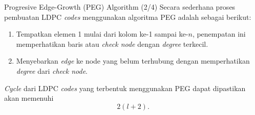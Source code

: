 \documentclass[11pt, aspectratio=169]{beamer}
\newcommand\blfootnote[1]{%
  \begingroup
  \renewcommand\thefootnote{}\footnote{#1}%
  \addtocounter{footnote}{-1}%
  \endgroup
}
\begin{document}
\begin{frame}{Progresive Edge-Growth (PEG) Algorithm (2/4)}
	Secara sederhana proses pembuatan LDPC \textit{codes} menggunakan algoritma PEG adalah sebagai  berikut:
	\begin{enumerate}
		\item Tempatkan elemen 1 mulai dari kolom ke-1 sampai ke-$n$, penempatan ini memperhatikan baris atau \textit{check node} dengan \textit{degree} terkecil.
		\item Menyebarkan \textit{edge} ke node yang belum terhubung dengan memperhatikan \textit{degree} dari \textit{check node}.
	\end{enumerate}
	\textit{Cycle} dari LDPC \textit{codes} yang terbentuk menggunakan PEG dapat dipastikan akan memenuhi 
	\begin{equation}
		2(l+2).
	\end{equation}


	
	
\end{frame}
\end{document}
